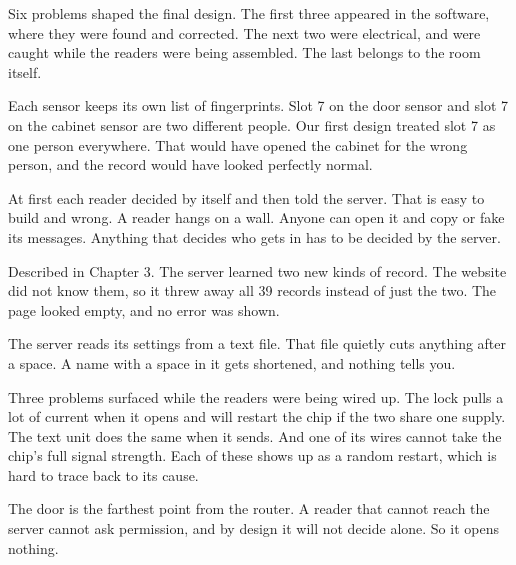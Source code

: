 

Six problems shaped the final design. The first three appeared in the software, where they were found and corrected. The next two were electrical, and were caught while the readers were being assembled. The last belongs to the room itself.


Each sensor keeps its own list of fingerprints. Slot 7 on the door sensor and
slot 7 on the cabinet sensor are two different people. Our first design treated
slot 7 as one person everywhere. That would have opened the cabinet for the
wrong person, and the record would have looked perfectly normal.


At first each reader decided by itself and then told the server. That is easy to
build and wrong. A reader hangs on a wall. Anyone can open it and copy or fake
its messages. Anything that decides who gets in has to be decided by the server.


Described in Chapter 3. The server learned two new kinds of record. The website
did not know them, so it threw away all 39 records instead of just the two. The
page looked empty, and no error was shown.


The server reads its settings from a text file. That file quietly cuts anything
after a space. A name with a space in it gets shortened, and nothing tells you.


Three problems surfaced while the readers were being wired up. The lock
pulls a lot of current when it opens and will restart the chip if the two
share one supply. The text unit does the same when it sends. And one of its
wires cannot take the chip's full signal strength. Each of these shows up as
a random restart, which is hard to trace back to its cause.


The door is the farthest point from the router. A reader that cannot reach the
server cannot ask permission, and by design it will not decide alone. So it
opens nothing.

